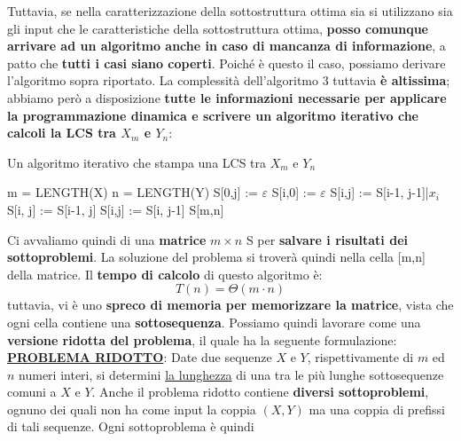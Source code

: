 \documentclass[12pt]{article}
\begin{document}
Tuttavia, se nella caratterizzazione della sottostruttura ottima sia si utilizzano sia gli input che le caratteristiche della sottostruttura ottima,
\textbf{posso comunque arrivare ad un algoritmo anche in caso di mancanza di informazione}, a patto che \textbf{tutti i casi siano coperti}. Poiché è questo il caso, possiamo derivare l'algoritmo
sopra riportato. La complessità dell'algoritmo 3 tuttavia \textbf{è altissima}; abbiamo però a disposizione \textbf{tutte le informazioni necessarie per applicare la programmazione dinamica e scrivere un algoritmo iterativo che calcoli la LCS tra $X_m$ e $Y_n$}: \newline
\begin{algorithm}[H]
    \caption{Un algoritmo iterativo che stampa una LCS tra $X_m$ e $Y_n$}
    \DontPrintSemicolon
     {
        m = LENGTH(X) \;
        n = LENGTH(Y) \;
         {
            S[0,j] := $\varepsilon$
        }
         {
            S[i,0] := $\varepsilon$
        }
         {
             {
                 {
                    S[i,j] := S[i-1, j-1]|$x_i$
                } {
                     {
                        S[i, j] := S[i-1, j]
                    } {
                        S[i,j] := S[i, j-1]
                    }
                }
            }
        }
        \Return S[m,n]
    }
\end{algorithm}
\noindent
Ci avvaliamo quindi di una \textbf{matrice} $m \times n$ S per \textbf{salvare i risultati dei sottoproblemi}.
La soluzione del problema si troverà quindi nella cella [m,n] della matrice. Il \textbf{tempo di calcolo} di questo algoritmo è:
$$T(n) = \Theta(m \cdot n)$$
tuttavia, vi è uno \textbf{spreco di memoria per memorizzare la matrice}, vista che ogni cella contiene una \textbf{sottosequenza}.
Possiamo quindi lavorare come una \textbf{versione ridotta del problema}, il quale ha la seguente formulazione: \newline
\textbf{\underline{PROBLEMA RIDOTTO}}: Date due sequenze $X$ e $Y$, rispettivamente di $m$ ed $n$ numeri interi, si determini \underline{la lunghezza} di una tra le più lunghe sottosequenze comuni a $X$ e $Y$. \newline
Anche il problema ridotto contiene \textbf{diversi sottoproblemi}, ognuno dei quali non ha come input la coppia $(X,Y)$ ma una coppia di prefissi di tali sequenze. Ogni sottoproblema è quindi
\end{document}

